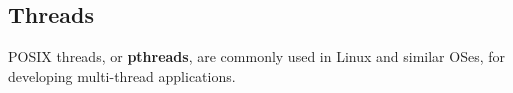 \subsection{Threads}
\label{sec:libos:thread}


POSIX threads, or {\bf pthreads},
are commonly used in Linux and similar OSes, for developing multi-thread applications.
